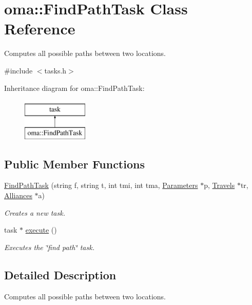 \hypertarget{classoma_1_1_find_path_task}{\section{oma\-:\-:Find\-Path\-Task Class Reference}
\label{classoma_1_1_find_path_task}
}


Computes all possible paths between two locations.  




{\ttfamily \#include $<$tasks.\-h$>$}

Inheritance diagram for oma\-:\-:Find\-Path\-Task\-:\begin{figure}[H]
\begin{center}
\leavevmode
\includegraphics[height=2.000000cm]{classoma_1_1_find_path_task}
\end{center}
\end{figure}
\subsection*{Public Member Functions}
\begin{DoxyCompactItemize}
\item 
\hyperlink{classoma_1_1_find_path_task_aac7c21433d1db181402f88c5e6701fbf}{Find\-Path\-Task} (string f, string t, int tmi, int tma, \hyperlink{struct_parameters}{Parameters} $\ast$p, \hyperlink{types_8h_aef021ba284c03a12dddcfa082468e831}{Travels} $\ast$tr, \hyperlink{types_8h_a942cbcc40778424afe78605ae5c364c0}{Alliances} $\ast$a)
\begin{DoxyCompactList}\small\item\em Creates a new task. \end{DoxyCompactList}\item 
task $\ast$ \hyperlink{classoma_1_1_find_path_task_a74af3710e7c56d27a2e65d50bbaaea49}{execute} ()
\begin{DoxyCompactList}\small\item\em Executes the \char`\"{}find path\char`\"{} task. \end{DoxyCompactList}\end{DoxyCompactItemize}


\subsection{Detailed Description}
Computes all possible paths between two locations. 

